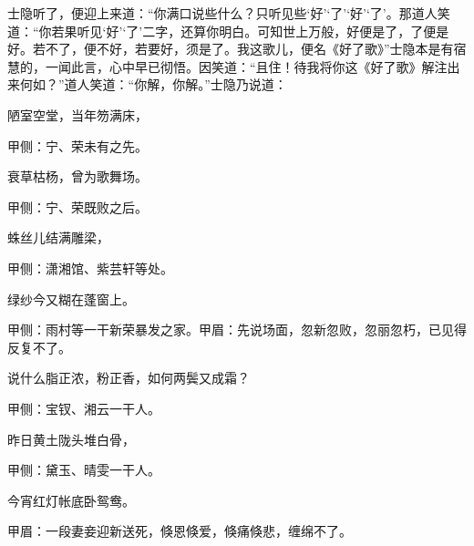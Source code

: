 \begin{parag}
    士隐听了，便迎上来道：“你满口说些什么？只听见些‘好’‘了’‘好’‘了’。那道人笑道：“你若果听见‘好’‘了’二字，还算你明白。可知世上万般，好便是了，了便是好。若不了，便不好，若要好，须是了。我这歌儿，便名《好了歌》”士隐本是有宿慧的，一闻此言，心中早已彻悟。因笑道：“且住！待我将你这《好了歌》解注出来何如？”道人笑道：“你解，你解。”士隐乃说道：
\end{parag}


\begin{poem}
    \begin{pl}陋室空堂，当年笏满床，\end{pl}\begin{note}甲侧：宁、荣未有之先。\end{note}

    \begin{pl}衰草枯杨，曾为歌舞场。\end{pl}\begin{note}甲侧：宁、荣既败之后。\end{note}

    \begin{pl}蛛丝儿结满雕梁，\end{pl}\begin{note}甲侧：潇湘馆、紫芸轩等处。\end{note}

    \begin{pl}绿纱今又糊在蓬窗上。\end{pl}\begin{note}甲侧：雨村等一干新荣暴发之家。甲眉：先说场面，忽新忽败，忽丽忽朽，已见得反复不了。\end{note}

    \begin{pl}说什么脂正浓，粉正香，如何两鬓又成霜？\end{pl}\begin{note}甲侧：宝钗、湘云一干人。\end{note}

    \begin{pl}昨日黄土陇头堆白骨，\end{pl}\begin{note}甲侧：黛玉、晴雯一干人。\end{note}

    \begin{pl}今宵红灯帐底卧鸳鸯。\end{pl}\begin{note}甲眉：一段妻妾迎新送死，倏恩倏爱，倏痛倏悲，缠绵不了。\end{note}


\end{poem}
